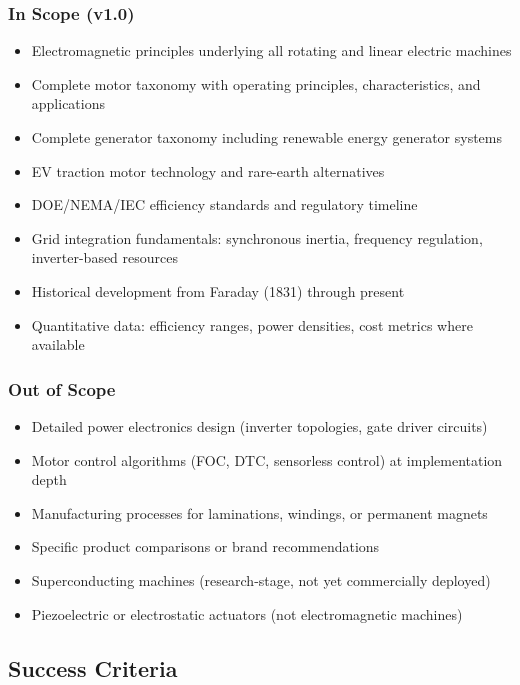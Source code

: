 \documentclass[11pt,letterpaper]{article}
\begin{document}
\subsubsection{In Scope (v1.0)}
\begin{itemize}[leftmargin=2em]
\item Electromagnetic principles underlying all rotating and linear electric machines
\item Complete motor taxonomy with operating principles, characteristics, and applications
\item Complete generator taxonomy including renewable energy generator systems
\item EV traction motor technology and rare-earth alternatives
\item DOE/NEMA/IEC efficiency standards and regulatory timeline
\item Grid integration fundamentals: synchronous inertia, frequency regulation, inverter-based resources
\item Historical development from Faraday (1831) through present
\item Quantitative data: efficiency ranges, power densities, cost metrics where available
\end{itemize}

\subsubsection{Out of Scope}
\begin{itemize}[leftmargin=2em]
\item Detailed power electronics design (inverter topologies, gate driver circuits)
\item Motor control algorithms (FOC, DTC, sensorless control) at implementation depth
\item Manufacturing processes for laminations, windings, or permanent magnets
\item Specific product comparisons or brand recommendations
\item Superconducting machines (research-stage, not yet commercially deployed)
\item Piezoelectric or electrostatic actuators (not electromagnetic machines)
\end{itemize}

\subsection{Success Criteria}
\end{document}
